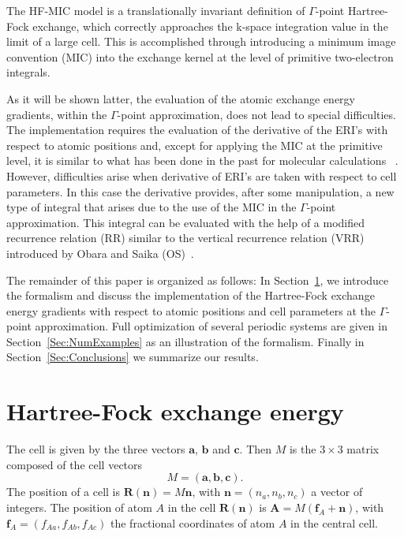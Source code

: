 \documentclass[prl,twocolumn,showpacs,twocolumngrid,superbib]{revtex4}
\begin{document}
The HF-MIC model is a translationally invariant definition of $\Gamma$-point Hartree-Fock exchange, 
which correctly approaches the k-space integration value in the limit of a
large cell. This is accomplished through introducing a 
minimum image convention (MIC) into the exchange kernel
at the level of primitive two-electron integrals.

As it will be shown latter, the evaluation of the atomic exchange energy gradients,
within the $\Gamma$-point approximation,
does not lead to special difficulties. The implementation requires the evaluation
of the derivative of the ERI's with respect to atomic positions and, 
except for applying the MIC at the primitive level, it is
similar to what has been done in the past for molecular calculations
~\cite{SObara86,MGordon88,KIshida91,THelgaker92,KIshida93}.
However, difficulties arise when derivative of ERI's are taken with respect to cell 
parameters. In this case the derivative provides, after some manipulation, 
a new type of integral that
arises due to the use of the MIC in the $\Gamma$-point approximation. This integral 
can be evaluated with the help of a modified recurrence relation (RR) similar to the
vertical recurrence relation (VRR) introduced by Obara and Saika (OS)~\cite{SObara86}.

The remainder of this paper is organized as follows:
In Section~\ref{Sec:Formalism}, we introduce the formalism and discuss
the implementation of the Hartree-Fock exchange energy gradients with respect 
to atomic positions and cell parameters
at the $\Gamma$-point approximation. Full optimization of several periodic systems are given
in Section~\ref{Sec:NumExamples} as an illustration of the formalism.
Finally in Section~\ref{Sec:Conclusions} we summarize our results.


\section{Hartree-Fock exchange energy}\label{Sec:Formalism}
The cell is given by the three vectors $\mathbf{a}$, 
$\mathbf{b}$ and $\mathbf{c}$. Then $M$ is the $3\times3$ matrix composed 
of the cell vectors
\begin{equation}
  M=(\mathbf{a},\mathbf{b},\mathbf{c}).
\end{equation}
The position of a cell is $\mathbf{R(n)}=M\mathbf{n}$,
with $\mathbf{n}=(n_a,n_b,n_c)$ a vector of integers.
The position of atom $A$ in the cell $\mathbf{R(n)}$ is $\mathbf{A}=M(\mathbf{f}_A+\mathbf{n})$,
with $\mathbf{f}_A=(f_{Aa},f_{Ab},f_{Ac})$ the fractional coordinates of 
atom $A$ in the central cell. 
\end{document}
